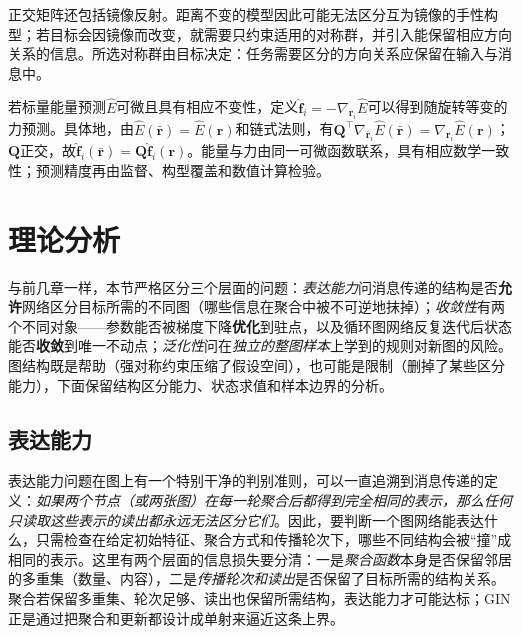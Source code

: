 正交矩阵还包括镜像反射。距离不变的模型因此可能无法区分互为镜像的手性构型；若目标会因镜像而改变，就需要只约束适用的对称群，并引入能保留相应方向关系的信息。所选对称群由目标决定：任务需要区分的方向关系应保留在输入与消息中。

若标量能量预测$\widehat E$可微且具有相应不变性，定义$\widehat{\bm{f}}_i=-\nabla_{\bm{r}_i}\widehat E$可以得到随旋转等变的力预测。具体地，由$\widehat E(\bar{\bm{r}})=\widehat E(\bm{r})$和链式法则，有$\bm{Q}^{\top}\nabla_{\bar{\bm{r}}_i}\widehat E(\bar{\bm{r}})=\nabla_{\bm{r}_i}\widehat E(\bm{r})$；$\bm{Q}$正交，故$\widehat{\bm{f}}_i(\bar{\bm{r}})=\bm{Q}\widehat{\bm{f}}_i(\bm{r})$。能量与力由同一可微函数联系，具有相应数学一致性；预测精度再由监督、构型覆盖和数值计算检验。

\section{理论分析}
\label{sec:gnn-theory}

与前几章一样，本节严格区分三个层面的问题：\emph{表达能力}问消息传递的结构是否\textbf{允许}网络区分目标所需的不同图（哪些信息在聚合中被不可逆地抹掉）；\emph{收敛性}有两个不同对象——参数能否被梯度下降\textbf{优化}到驻点，以及循环图网络反复迭代后状态能否\textbf{收敛}到唯一不动点；\emph{泛化性}问在\emph{独立的整图样本}上学到的规则对新图的风险。图结构既是帮助（强对称约束压缩了假设空间），也可能是限制（删掉了某些区分能力），下面保留结构区分能力、状态求值和样本边界的分析。

\subsection{表达能力}
\label{sec:gnn-expressivity}
\label{sec:gnn-propagation-theory}

表达能力问题在图上有一个特别干净的判别准则，可以一直追溯到消息传递的定义：\emph{如果两个节点（或两张图）在每一轮聚合后都得到完全相同的表示，那么任何只读取这些表示的读出都永远无法区分它们}。因此，要判断一个图网络能表达什么，只需检查在给定初始特征、聚合方式和传播轮次下，哪些不同结构会被“撞”成相同的表示。这里有两个层面的信息损失要分清：一是\emph{聚合函数}本身是否保留邻居的多重集（数量、内容），二是\emph{传播轮次和读出}是否保留了目标所需的结构关系。聚合若保留多重集、轮次足够、读出也保留所需结构，表达能力才可能达标；GIN正是通过把聚合和更新都设计成单射来逼近这条上界。

